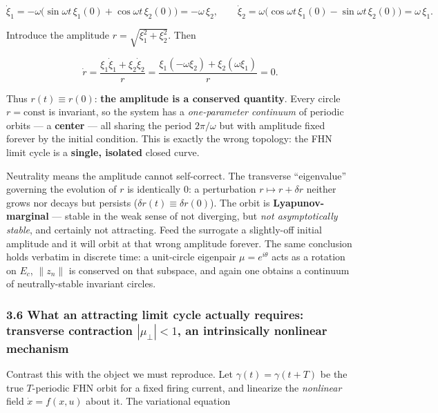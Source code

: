 \documentclass[
  11pt,
]{article}
\providecommand{\lt}{<}
\begin{document}
\[
\dot\xi_1=-\omega\big(\sin\omega t\,\xi_1(0)+\cos\omega t\,\xi_2(0)\big)=-\omega\,\xi_2,
\qquad
\dot\xi_2=\omega\big(\cos\omega t\,\xi_1(0)-\sin\omega t\,\xi_2(0)\big)=\omega\,\xi_1 .
\]

Introduce the amplitude \(r=\sqrt{\xi_1^2+\xi_2^2}\). Then

\[
\dot r = \frac{\xi_1\dot\xi_1+\xi_2\dot\xi_2}{r}
       = \frac{\xi_1(-\omega\xi_2)+\xi_2(\omega\xi_1)}{r} = 0 .
\]

Thus \(r(t)\equiv r(0)\): \textbf{the amplitude is a conserved
quantity}. Every circle \(r=\text{const}\) is invariant, so the system
has a \emph{one-parameter continuum} of periodic orbits --- a
\textbf{center} --- all sharing the period \(2\pi/\omega\) but with
amplitude fixed forever by the initial condition. This is exactly the
wrong topology: the FHN limit cycle is a \textbf{single, isolated}
closed curve.

Neutrality means the amplitude cannot self-correct. The transverse
``eigenvalue'' governing the evolution of \(r\) is identically \(0\): a
perturbation \(r\mapsto r+\delta r\) neither grows nor decays but
persists (\(\delta r(t)\equiv\delta r(0)\)). The orbit is
\textbf{Lyapunov-marginal} --- stable in the weak sense of not
diverging, but \emph{not asymptotically stable}, and certainly not
attracting. Feed the surrogate a slightly-off initial amplitude and it
will orbit at that wrong amplitude forever. The same conclusion holds
verbatim in discrete time: a unit-circle eigenpair \(\mu=e^{i\theta}\)
acts as a rotation on \(E_c\), \(\|z_n\|\) is conserved on that
subspace, and again one obtains a continuum of neutrally-stable
invariant circles.

\subsubsection{\texorpdfstring{3.6 What an attracting limit cycle
actually requires: transverse contraction \(|\mu_\perp|\lt 1\), an
intrinsically nonlinear
mechanism}{3.6 What an attracting limit cycle actually requires: transverse contraction \textbar\textbackslash mu\_\textbackslash perp\textbar\textbackslash lt 1, an intrinsically nonlinear mechanism}}\label{what-an-attracting-limit-cycle-actually-requires-transverse-contraction-mu_perplt-1-an-intrinsically-nonlinear-mechanism}

Contrast this with the object we must reproduce. Let
\(\gamma(t)=\gamma(t+T)\) be the true \(T\)-periodic FHN orbit for a
fixed firing current, and linearize the \emph{nonlinear} field
\(\dot x=f(x,u)\) about it. The variational equation
\end{document}
